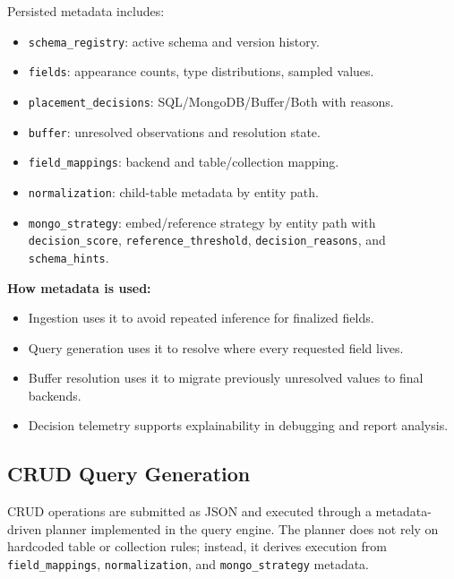 \documentclass[12pt,a4paper]{article}
\begin{document}
Persisted metadata includes:
\begin{itemize}[leftmargin=*]
  \item \texttt{schema\_registry}: active schema and version history.
  \item \texttt{fields}: appearance counts, type distributions, sampled values.
  \item \texttt{placement\_decisions}: SQL/MongoDB/Buffer/Both with reasons.
  \item \texttt{buffer}: unresolved observations and resolution state.
  \item \texttt{field\_mappings}: backend and table/collection mapping.
  \item \texttt{normalization}: child-table metadata by entity path.
  \item \texttt{mongo\_strategy}: embed/reference strategy by entity path with \texttt{decision\_score}, \texttt{reference\_threshold}, \texttt{decision\_reasons}, and \texttt{schema\_hints}.
\end{itemize}

\textbf{How metadata is used:}
\begin{itemize}[leftmargin=*]
  \item Ingestion uses it to avoid repeated inference for finalized fields.
  \item Query generation uses it to resolve where every requested field lives.
  \item Buffer resolution uses it to migrate previously unresolved values to final backends.
  \item Decision telemetry supports explainability in debugging and report analysis.
\end{itemize}

\subsection{CRUD Query Generation}
CRUD operations are submitted as JSON and executed through a metadata-driven planner implemented in the query engine. The planner does not rely on hardcoded table or collection rules; instead, it derives execution from \texttt{field\_mappings}, \texttt{normalization}, and \texttt{mongo\_strategy} metadata.
\end{document}
